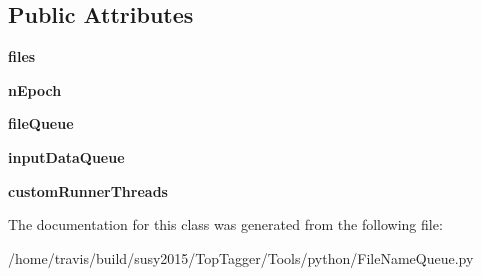 \subsection*{Public Attributes}
\begin{DoxyCompactItemize}
\item 
\hypertarget{classFileNameQueue_1_1FileNameQueue_a7ab700eeebb00f7b586ff3ca7299b016}{{\bfseries files}}\label{classFileNameQueue_1_1FileNameQueue_a7ab700eeebb00f7b586ff3ca7299b016}

\item 
\hypertarget{classFileNameQueue_1_1FileNameQueue_ad4cac71c6ecb2d22c2e00b1b80cafd0c}{{\bfseries n\-Epoch}}\label{classFileNameQueue_1_1FileNameQueue_ad4cac71c6ecb2d22c2e00b1b80cafd0c}

\item 
\hypertarget{classFileNameQueue_1_1FileNameQueue_af94c59d51930e68104548a831501f746}{{\bfseries file\-Queue}}\label{classFileNameQueue_1_1FileNameQueue_af94c59d51930e68104548a831501f746}

\item 
\hypertarget{classFileNameQueue_1_1FileNameQueue_ab5d275ac643e94fdcffe97f1f8ab04d8}{{\bfseries input\-Data\-Queue}}\label{classFileNameQueue_1_1FileNameQueue_ab5d275ac643e94fdcffe97f1f8ab04d8}

\item 
\hypertarget{classFileNameQueue_1_1FileNameQueue_a95d463f60468ef0af146f969bdbf5c93}{{\bfseries custom\-Runner\-Threads}}\label{classFileNameQueue_1_1FileNameQueue_a95d463f60468ef0af146f969bdbf5c93}

\end{DoxyCompactItemize}


The documentation for this class was generated from the following file\-:\begin{DoxyCompactItemize}
\item 
/home/travis/build/susy2015/\-Top\-Tagger/\-Tools/python/File\-Name\-Queue.\-py\end{DoxyCompactItemize}

